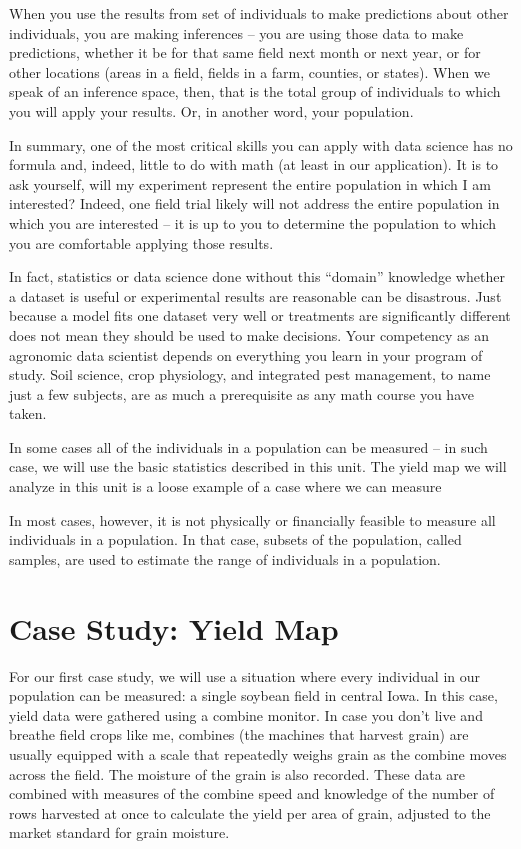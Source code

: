 \documentclass[
]{book}
\begin{document}
When you use the results from set of individuals to make predictions
about other individuals, you are making inferences -- you are using
those data to make predictions, whether it be for that same field next
month or next year, or for other locations (areas in a field, fields in
a farm, counties, or states). When we speak of an inference space, then,
that is the total group of individuals to which you will apply your
results. Or, in another word, your population.

In summary, one of the most critical skills you can apply with data
science has no formula and, indeed, little to do with math (at least in
our application). It is to ask yourself, will my experiment represent
the entire population in which I am interested? Indeed, one field trial
likely will not address the entire population in which you are
interested -- it is up to you to determine the population to which you
are comfortable applying those results.

In fact, statistics or data science done without this ``domain'' knowledge
whether a dataset is useful or experimental results are reasonable can
be disastrous. Just because a model fits one dataset very well or
treatments are significantly different does not mean they should be used
to make decisions. Your competency as an agronomic data scientist
depends on everything you learn in your program of study. Soil science,
crop physiology, and integrated pest management, to name just a few
subjects, are as much a prerequisite as any math course you have taken.

In some cases all of the individuals in a population can be measured --
in such case, we will use the basic statistics described in this unit.
The yield map we will analyze in this unit is a loose example of a case
where we can measure

In most cases, however, it is not physically or financially feasible to
measure all individuals in a population. In that case, subsets of the
population, called samples, are used to estimate the range of
individuals in a population.

\hypertarget{case-study-yield-map}{%
\section{Case Study: Yield Map}\label{case-study-yield-map}}

For our first case study, we will use a situation where every individual
in our population can be measured: a single soybean field in central
Iowa. In this case, yield data were gathered using a combine monitor. In
case you don't live and breathe field crops like me, combines (the
machines that harvest grain) are usually equipped with a scale that
repeatedly weighs grain as the combine moves across the field. The
moisture of the grain is also recorded. These data are combined with
measures of the combine speed and knowledge of the number of rows
harvested at once to calculate the yield per area of grain, adjusted to
the market standard for grain moisture.
\end{document}
